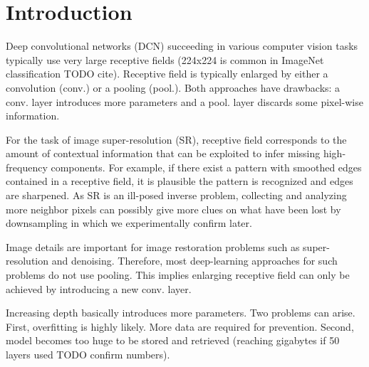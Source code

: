 \documentclass[10pt,twocolumn,letterpaper]{article}
\begin{document}
\section{Introduction}
Deep convolutional networks (DCN) succeeding in various computer vision tasks typically use very large receptive fields  (224x224 is common in ImageNet classification TODO cite). Receptive field is typically enlarged by either a convolution (conv.) or a pooling (pool.).  Both approaches have drawbacks: a conv. layer introduces more parameters and a pool. layer discards some pixel-wise information. 


For the task of image super-resolution (SR), receptive field corresponds to the amount of contextual information that can be exploited to infer missing high-frequency components. For example, if there exist a pattern with smoothed edges contained in a receptive field, it is plausible the pattern is recognized and edges are sharpened. As SR is an ill-posed inverse problem, collecting and analyzing more neighbor pixels can possibly give more clues on what have been lost by downsampling in which we experimentally confirm later.  

Image details are important for image restoration problems such as super-resolution and denoising. Therefore, most deep-learning approaches for such problems do not use pooling. This implies enlarging receptive field can only be achieved by introducing a new conv. layer.

Increasing depth basically introduces more parameters. Two problems can arise. First, overfitting is highly likely. More data are required for prevention. Second, model becomes too huge to be stored and retrieved (reaching gigabytes if 50 layers used TODO confirm numbers).

 

\end{document}
